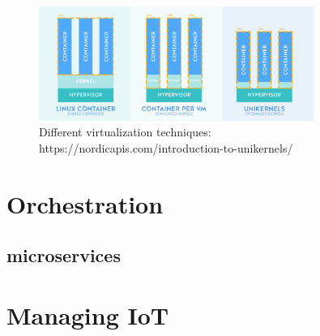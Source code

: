 \begin{figure}[htpb]
    \centering
    \includegraphics[width=0.8\textwidth]{figures/Linux-containers-vms-unikernels.png}
    \caption{Different virtualization techniques: https://nordicapis.com/introduction-to-unikernels/} \label{fig:virt}
  \end{figure}

  \section{Orchestration}

  \subsection{microservices}
\section{Managing IoT}
